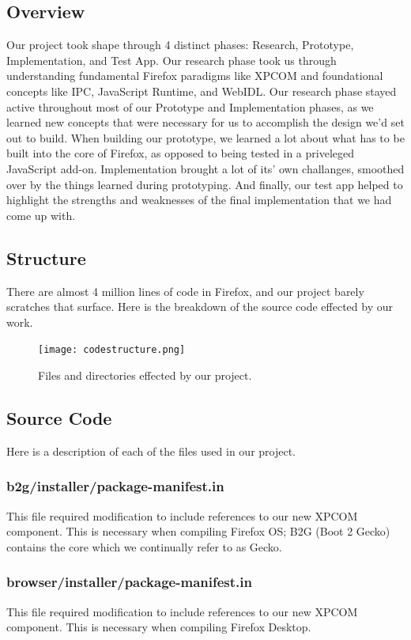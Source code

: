 \documentclass[12pt]{article}
\begin{document}
\subsection{Overview}
Our project took shape through 4 distinct phases: Research, Prototype, Implementation, and Test App. Our research phase took us through understanding fundamental Firefox paradigms like XPCOM and foundational concepts like IPC, JavaScript Runtime, and WebIDL. Our research phase stayed active throughout most of our Prototype and Implementation phases, as we learned new concepts that were necessary for us to accomplish the design we'd set out to build. When building our prototype, we learned a lot about what has to be built into the core of Firefox, as opposed to being tested in a priveleged JavaScript add-on. Implementation brought a lot of its' own challanges, smoothed over by the things learned during prototyping. And finally, our test app helped to highlight the strengths and weaknesses of the final implementation that we had come up with.
\pagebreak

\subsection{Structure}
There are almost 4 million lines of code in Firefox, and our project barely scratches that surface. Here is the breakdown of the source code effected by our work.

\begin{figure}[h!]
  \centering
		\texttt{[image: codestructure.png]}
  \caption{Files and directories effected by our project.}
\end{figure}
\pagebreak

\subsection{Source Code}
Here is a description of each of the files used in our project.

\subsubsection{b2g/installer/package-manifest.in}
This file required modification to include references to our new XPCOM component. This is necessary when compiling Firefox OS; B2G (Boot 2 Gecko) contains the core which we continually refer to as Gecko.

\subsubsection{browser/installer/package-manifest.in}
This file required modification to include references to our new XPCOM component. This is necessary when compiling Firefox Desktop.
\end{document}
